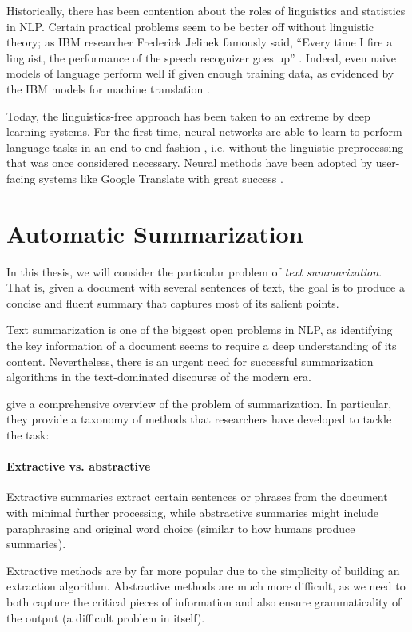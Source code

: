 \documentclass[12pt]{report}
\begin{document}
Historically, there has been contention about the roles of linguistics and statistics in NLP. Certain practical problems seem to be better off without linguistic theory; as IBM researcher Frederick Jelinek famously said, ``Every time I fire a linguist, the performance of the speech recognizer goes up'' \citep{Jurafsky2009}. Indeed, even naive models of language perform well if given enough training data, as evidenced by the IBM models for machine translation \citep{Brown1993}.

Today, the linguistics-free approach has been taken to an extreme by deep learning systems. For the first time, neural networks are able to learn to perform language tasks in an end-to-end fashion \citep{Collobert2011}, i.e. without the linguistic preprocessing that was once considered necessary.
Neural methods have been adopted by user-facing systems like Google Translate with great success \citep{GoogleTranslate2016}.


\section{Automatic Summarization}
\label{sec:taxonomy}

In this thesis, we will consider the particular problem of \emph{text summarization}.
That is, given a document with several sentences of text, the goal is to produce a concise and fluent summary that captures most of its salient points.

Text summarization is one of the biggest open problems in NLP, as identifying the key information of a document seems to require a deep understanding of its content. Nevertheless, there is an urgent need for successful summarization algorithms in the text-dominated discourse of the modern era.

\citet{Nenkova2011} give a comprehensive overview of the problem of summarization. In particular, they provide a taxonomy of methods that researchers have developed to tackle the task:

\paragraph{Extractive vs. abstractive} Extractive summaries extract certain sentences or phrases from the document with minimal further processing, while abstractive summaries might include paraphrasing and original word choice (similar to how humans produce summaries). 

Extractive methods are by far more popular due to the simplicity of building an extraction algorithm. Abstractive methods are much more difficult, as we need to both capture the critical pieces of information and also ensure grammaticality of the output (a difficult problem in itself).
\end{document}
